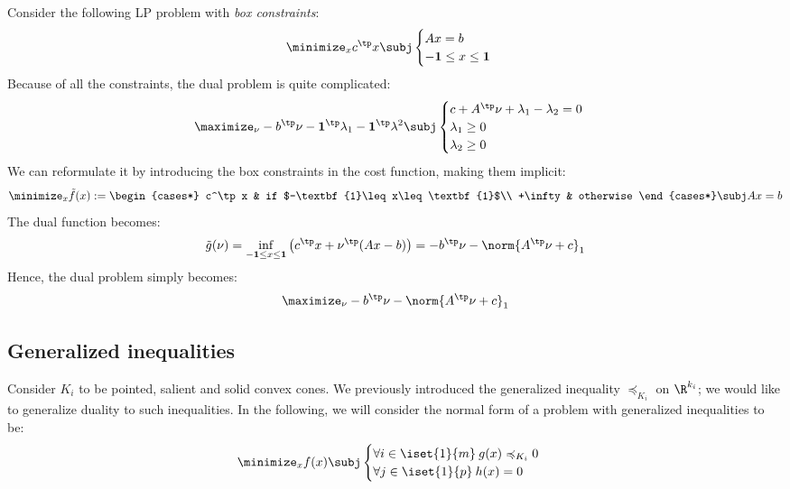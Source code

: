 \begin{example}
    Consider the following LP problem with \emph{box constraints}:
    \begin{equation*}
        \minimize_x c^\tp x \subj \begin{cases}
            Ax=b\\
            -\textbf{1}\leq x\leq\textbf{1}
        \end{cases}
    \end{equation*}
    Because of all the constraints, the dual problem is quite complicated:
    \begin{equation*}
        \maximize_\nu -b^\tp\nu-\textbf{1}^\tp\lambda_1-\textbf{1}^\tp\lambda^2 \subj \begin{cases}
            c+A^\tp\nu+\lambda_1-\lambda_2=0\\
            \lambda_1\geq0\\
            \lambda_2\geq0
        \end{cases}
    \end{equation*}
    We can reformulate it by introducing the box constraints in the cost function, making them implicit:
    \begin{equation*}
        \minimize_x \tilde{f}(x) := \begin{cases*}
            c^\tp x & if $-\textbf{1}\leq x\leq\textbf{1}$\\
            +\infty & otherwise
        \end{cases*}
        \subj Ax=b
    \end{equation*}
    The dual function becomes:
    \begin{equation*}
        \tilde{g}(\nu) = \inf_{-\textbf{1}\leq x\leq\textbf{1}} \left(c^\tp x+\nu^\tp(Ax-b)\right) = -b^\tp\nu-\norm{A^\tp\nu+c}_1
    \end{equation*}
    Hence, the dual problem simply becomes:
    \begin{equation*}
        \maximize_\nu -b^\tp\nu - \norm{A^\tp\nu+c}_1
    \end{equation*}
\end{example}

\subsection{Generalized inequalities}
Consider $K_i$ to be pointed, salient and solid convex cones. We previously introduced the generalized inequality $\preccurlyeq_{K_i}$ on $\R^{k_i}$; we would like to generalize duality to such inequalities. In the following, we will consider the normal form of a problem with generalized inequalities to be:
\begin{equation*}
    \minimize_x f(x) \subj \begin{cases}
        \forall i\in\iset{1}{m}\: g(x)\preccurlyeq_{K_i}0\\
        \forall j\in\iset{1}{p}\: h(x)=0
    \end{cases}
\end{equation*}

